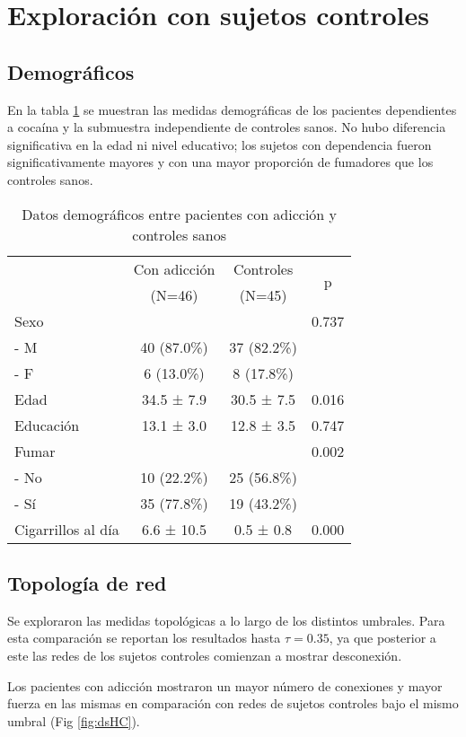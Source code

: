 \section{Exploración con sujetos controles}
\subsection{Demográficos}

En la tabla \ref{tab:demHC} se muestran las medidas demográficas de los pacientes dependientes a cocaína y la submuestra independiente de controles sanos.
No hubo diferencia significativa en la edad ni nivel educativo; los sujetos con dependencia fueron significativamente mayores y con una mayor proporción de fumadores que los controles sanos.

\begin{table}[hbp]
    \centering
    \small
    \caption{Datos demográficos entre pacientes con adicción y controles sanos}
    \label{tab:demHC}
    \begin{tabular}{lccc}
        \hline
        & Con adicción & Controles & \multirow{2}{*}{p}\\
        & (N=46) & (N=45) & \\
        \hline
        Sexo            &  &  & 0.737\\
        - M           & 40 (87.0\%) & 37 (82.2\%) & \\
        - F           & 6 (13.0\%) & 8 (17.8\%) & \\
        Edad            & 34.5 ±  7.9 & 30.5 ±  7.5 & 0.016\\
        Educación       & 13.1 ±  3.0 & 12.8 ±  3.5 & 0.747\\
        Fumar           &  &  & 0.002\\
        - No          & 10 (22.2\%) & 25 (56.8\%) & \\
        - Sí          & 35 (77.8\%) & 19 (43.2\%) & \\
        Cigarrillos al día &  6.6 ± 10.5 &  0.5 ±  0.8 & 0.000\\
        \hline
    \end{tabular}
\end{table}

\subsection{Topología de red}
Se exploraron las medidas topológicas a lo largo de los distintos umbrales.
Para esta comparación se reportan los resultados hasta $\tau = 0.35$, ya que posterior a este las redes de los sujetos controles comienzan a mostrar desconexión.\par
Los pacientes con adicción mostraron un mayor número de conexiones y mayor fuerza en las mismas en comparación con redes de sujetos controles
bajo el mismo umbral (Fig \ref{fig:dsHC}).

